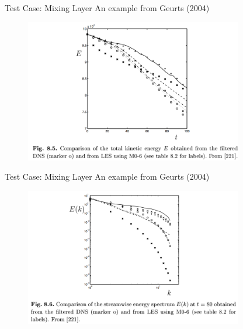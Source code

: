 \begin{frame}{Test Case: Mixing Layer}
An example from Geurts (2004)
\begin{figure}
\includegraphics[width=0.85\textwidth]{compare5}	
\end{figure}
\end{frame}
\begin{frame}{Test Case: Mixing Layer}
An example from Geurts (2004)
\begin{figure}
\includegraphics[width=0.85\textwidth]{compare6}	
\end{figure}
\end{frame}
